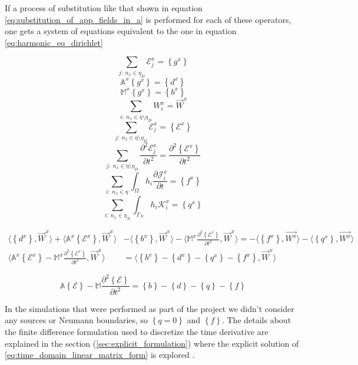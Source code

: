 If a process of substitution like that shown in equation \ref{eq:substitution_of_app_fields_in_a} is performed for each of these operators, one gets a system of equations equivalent to the one in equation \ref{eq:harmonic_eq_dirichlet}

$$\sum_{j:\ n_x \in \eta_D}\mathcal{E}_j^x = \left\lbrace g^x \right\rbrace $$
$$ \mathbb{A}^x\left\lbrace g^x \right\rbrace=\left\lbrace d^x \right\rbrace$$ 
$$\mathbb{M}^x\left\lbrace g^x \right\rbrace=\left\lbrace b^x \right\rbrace$$
$$\sum_{i:\ n_x \in \eta\setminus\eta_D}W_i^x = \vec{W}^x $$
$$\sum_{j:\ n_x \in\eta\setminus\eta_D}\mathcal{E}_j^x = \left\lbrace \mathcal{E}^x\right\rbrace $$
$$\sum_{j:\ n_x \in\eta\setminus\eta_D}\frac{\partial^2 \mathcal{E}_j^x}{\partial t^2} = \frac{\partial^2\left\lbrace \mathcal{E}^x\right\rbrace}{\partial t^2} $$
$$ \sum_{i:\ n_x \in \eta}\int_{\Omega} h_i\frac{\partial\mathcal{J}_i^x}{\partial t} = \left\lbrace f^x \right\rbrace $$
$$\sum_{i:\ n_x \in \eta_N}\int_{\Gamma_N} h_i\mathcal{K}_i^x = \left\lbrace q^x   \right\rbrace$$

\begin{align}
\langle\left\lbrace d^x \right\rbrace,\vec{W}^x\rangle
+\langle\mathbb{A}^x\left\lbrace\mathcal{E}^x \right\rbrace,\vec{W}^x\rangle&-\langle \left\lbrace b^x \right\rbrace,\vec{W}^x\rangle
-\langle\mathbb{M}^x \frac{\partial^2\left\lbrace\mathcal{E}^x \right\rbrace}{\partial t^2},\vec{W}^x\rangle = -\langle \left\lbrace f^x\right\rbrace, \vec{W^x}\rangle-\langle \left\lbrace q^x\right\rbrace, \vec{W^x}\rangle \nonumber\\
\langle\mathbb{A}^x\left\lbrace \mathcal{E}^x \right\rbrace- \mathbb{M}^x\frac{\partial^2\left\lbrace\mathcal{E}^x \right\rbrace}{\partial t^2},\vec{W}^x \rangle &=\langle \left\lbrace b^x \right\rbrace-\left\lbrace d^x \right\rbrace-\left\lbrace q^x   \right\rbrace-\left\lbrace f^x\right\rbrace , \vec{W}^x \rangle
\end{align}

\begin{equation}
\mathbb{A}\left\lbrace \mathcal{E} \right\rbrace- \mathbb{M}\frac{\partial^2\left\lbrace\mathcal{E} \right\rbrace}{\partial t^2} = \left\lbrace b \right\rbrace-\left\lbrace d \right\rbrace-\left\lbrace q   \right\rbrace-\left\lbrace f\right\rbrace
\label{eq:time_domain_linear_matrix_form}
\end{equation}

In the simulations that were performed as part of the project we didn't consider any sources or Neumann boundaries, so $\left\lbrace q=0\right\rbrace$ and $\left\lbrace f\right\rbrace$. The details about the finite difference formulation used to discretize the time derivative are explained in the section (\ref{sec:explicit_formulation}) where the explicit solution of \ref{eq:time_domain_linear_matrix_form} is explored .


